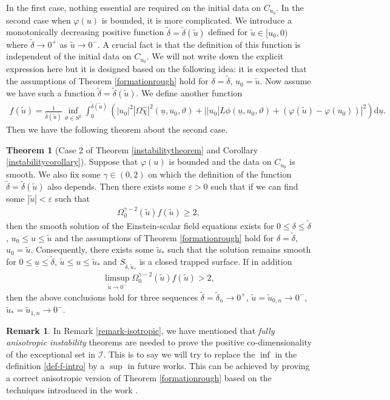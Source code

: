 \documentclass[11pt,reqno]{amsart}
\theoremstyle{definition}
\newtheorem{theorem}{Theorem}[section]
\newtheorem{remark}{Remark}[section]
\numberwithin{equation}{section}
\newcommand{\D}{\mathrm{d}}
\def\chih{\widehat{\chi}}
\def\ub{\underline{u}}
\newcommand{\tdelta}{\widetilde{\delta}}
\newcommand{\tu}{\widetilde{u}}
\begin{document}
In the first case, nothing essential are required on the initial data on $C_{u_0}$. In the second case when $\varphi(u)$ is bounded, it is more complicated. We introduce a monotonically decreasing positive function $\tdelta=\tdelta(\tu)$ defined for $\tu\in[u_0,0)$ where $\tdelta\to0^+$ as $\tu\to0^-$. A crucial fact is that the definition of this function is independent of the initial data on $C_{u_0}$. We will not write down the explicit expression here but it is designed based on the following idea: it is expected that the assumptions of Theorem \ref{formationrough} hold for $\delta=\tdelta$, $u_0=\tu$. Now assume we have such a function $\tdelta=\tdelta(\tu)$. We define another function
\begin{align}\label{def-f-intro}
f(\tu)=\frac{1}{\tdelta(\tu)}\inf_{\vartheta\in S^2}\int_0^{\tdelta(\tu)}(|u_0|^2|\Omega\chih|^2(\ub,u_0,\vartheta)+||u_0|L\phi(\ub,u_0,\vartheta)+(\varphi(\tu)-\varphi(u_0))|^2)\D\ub.
\end{align}
Then we have the following theorem about the second case.
\begin{theorem}[Case 2 of Theorem \ref{instabilitytheorem} and Corollary \ref{instabilitycorollary}]\label{instabilityrough2}
Suppose that $\varphi(u)$ is bounded and the data on $C_{u_0}$ is smooth. We also fix some $\gamma\in(0,2)$ on which the definition of the function $\tdelta=\tdelta(\tu)$ also depends. Then there exists some $\varepsilon>0$ such that if we can find some $|\tu|<\varepsilon$ such that
\begin{align*}
\Omega_0^{\gamma-2}(\tu)f(\tu)\ge2,
\end{align*}
then the smooth solution of the Einstein-scalar field equations exists for $0\le\delta\le\tdelta$, $u_0\le u\le \tu$ and the assumptions of Theorem \ref{formationrough} hold for $\delta=\tdelta$, $u_0=\tu$. Consequently, there exists some $\tu_*$ such that the solution remains smooth for $0\le\ub\le\tdelta$, $\tu\le u\le \tu_*$ and $S_{\tdelta,\tu_*}$ is a closed trapped surface. If in addition \begin{align}\label{instabilitycondition-chih-intro}
\limsup_{\tu\to0^-}\Omega_0^{\gamma-2}(\tu)f(\tu)>2,
\end{align}
then the above conclusions hold for three sequences $\tdelta=\tdelta_n\to0^+$, $\tu=\tu_{0,n}\to0^-$, $\tu_*=\tu_{1,n}\to0^-$.
\end{theorem} 

\begin{remark}
In Remark \ref{remark-isotropic}, we have mentioned that \emph{fully anisotropic instability} theorems are needed to prove the positive co-dimensionality of the exceptional set in $\mathcal{I}$. This is to say we will try to replace the $\inf$ in the definition \eqref{def-f-intro} by a $\sup$ in future works. This can be achieved by proving a correct anisotropic version of Theorem \ref{formationrough} based on the techniques introduced in the work \cite{K-L-R}.
\end{remark}
\end{document}
